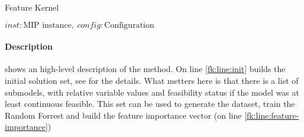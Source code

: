 \begin{algorithm}[H]
    \caption[FAKE TITLE]{Feature Kernel}\label{algo:feature-kernel}
    \begin{algorithmic}[1]
        \REQUIRE $inst: \text{MIP instance},\ config: \text{Configuration}$
         \label{fk:line:init}
         \label{fk:line:feature-importance}
    \end{algorithmic}
\end{algorithm}

\paragraph{Description}  shows an high-level description of the method. On line \ref{fk:line:init} 
 builds the initial solution set, see  for the details. What metters here is
that there is a list of submodels, with relative variable values and feasibility status if the model was at least continuous feasible. This 
set can be used to generate the dataset, train the Random Forrest and build the feature importance vector (on line \ref{fk:line:feature-importance})



